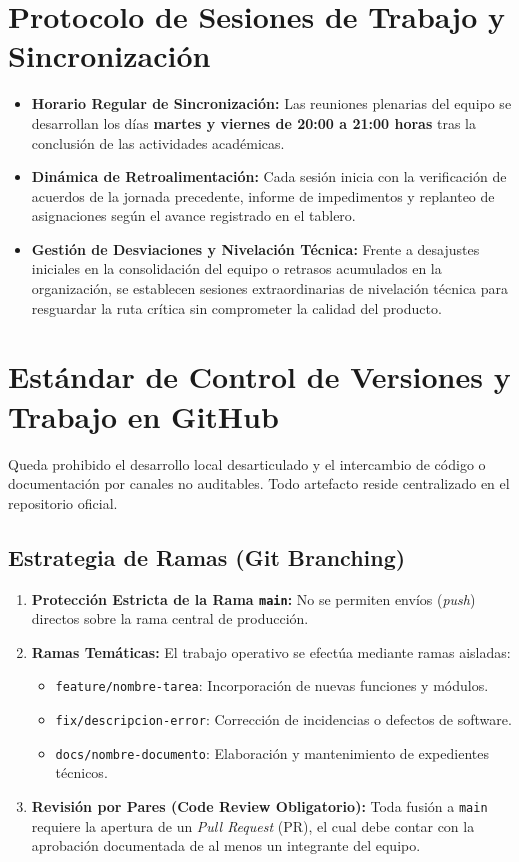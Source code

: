\documentclass[11pt,a4paper]{article}
\begin{document}
\section{Protocolo de Sesiones de Trabajo y Sincronización}
\begin{itemize}[leftmargin=*]
    \item \textbf{Horario Regular de Sincronización:} Las reuniones plenarias del equipo se desarrollan los días \textbf{martes y viernes de 20:00 a 21:00 horas} tras la conclusión de las actividades académicas.
    \item \textbf{Dinámica de Retroalimentación:} Cada sesión inicia con la verificación de acuerdos de la jornada precedente, informe de impedimentos y replanteo de asignaciones según el avance registrado en el tablero.
    \item \textbf{Gestión de Desviaciones y Nivelación Técnica:} Frente a desajustes iniciales en la consolidación del equipo o retrasos acumulados en la organización, se establecen sesiones extraordinarias de nivelación técnica para resguardar la ruta crítica sin comprometer la calidad del producto.
\end{itemize}

\section{Estándar de Control de Versiones y Trabajo en GitHub}
Queda prohibido el desarrollo local desarticulado y el intercambio de código o documentación por canales no auditables. Todo artefacto reside centralizado en el repositorio oficial.

\subsection{Estrategia de Ramas (Git Branching)}
\begin{enumerate}[leftmargin=*]
    \item \textbf{Protección Estricta de la Rama \texttt{main}:} No se permiten envíos (\textit{push}) directos sobre la rama central de producción.
    \item \textbf{Ramas Temáticas:} El trabajo operativo se efectúa mediante ramas aisladas:
    \begin{itemize}
        \item \texttt{feature/nombre-tarea}: Incorporación de nuevas funciones y módulos.
        \item \texttt{fix/descripcion-error}: Corrección de incidencias o defectos de software.
        \item \texttt{docs/nombre-documento}: Elaboración y mantenimiento de expedientes técnicos.
    \end{itemize}
    \item \textbf{Revisión por Pares (Code Review Obligatorio):} Toda fusión a \texttt{main} requiere la apertura de un \textit{Pull Request} (PR), el cual debe contar con la aprobación documentada de al menos un integrante del equipo.
\end{enumerate}
\end{document}
